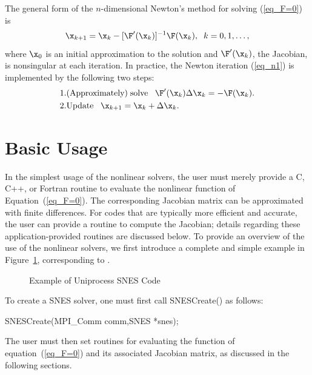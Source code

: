The general form of the $n$-dimensional Newton's method for solving
(\ref{eq_F=0}) is
\begin{equation}
     \x_{k+1} = \x_k - [ \F'(\x_k)]^{-1} \F(\x_k), \;\; k=0,1, \ldots, 
\label{eq_n1}
\end{equation}
where $ \x_0 $ is an initial approximation to the solution and   
$ \F'(\x_k) $, the Jacobian, is nonsingular at each iteration.  
In practice, the Newton iteration (\ref{eq_n1}) is implemented by
the following two steps:
\begin{eqnarray}
  1. & {\rm (Approximately) \;solve\;\;\;} \F'(\x_k) \Delta \x_k = -\F(\x_k).\\
  2. & {\rm Update\;\;\;} \x_{k+1} = \x_k + \Delta \x_k. \hspace{.225in}
\end{eqnarray}


\section{Basic Usage}
\label{sec_snesusage}

In the simplest usage of the nonlinear solvers, the user must merely 
provide a C, C++, or Fortran routine to evaluate the nonlinear function 
of Equation~(\ref{eq_F=0}).
The corresponding Jacobian  matrix 
can be approximated with finite differences.
For codes that are typically more efficient and accurate, the
user can provide a routine to compute the Jacobian; details regarding these application-provided 
routines are discussed below.  
To provide an overview of the use of the nonlinear solvers,
we first introduce a complete and simple example in
Figure~\ref{fig_snesexample}, corresponding to 
.  

\begin{figure}[H]
{\small
{}
}
\caption{Example of Uniprocess SNES Code}
\label{fig_snesexample}
\end{figure}

To create a SNES solver, one must first call SNESCreate() as follows:
\begin{tabbing}
  SNESCreate(MPI\_Comm comm,SNES *snes);\\
\end{tabbing}
The user must then set
routines for evaluating the function of equation~(\ref{eq_F=0}) and its
associated Jacobian matrix, as discussed in the following sections.

